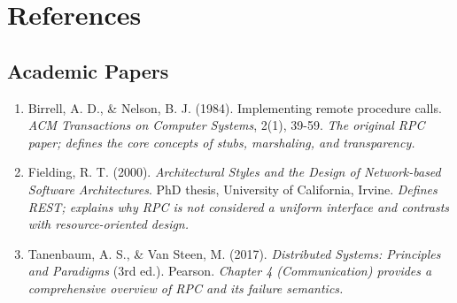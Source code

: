 \documentclass[10pt,a4paper]{article}
\begin{document}
\section*{References}
\subsection*{Academic Papers}
\begin{enumerate}
    \item Birrell, A. D., \& Nelson, B. J. (1984). Implementing remote procedure calls. \textit{ACM Transactions on Computer Systems}, 2(1), 39-59.  
    \textit{The original RPC paper; defines the core concepts of stubs, marshaling, and transparency.}
    
    \item Fielding, R. T. (2000). \textit{Architectural Styles and the Design of Network-based Software Architectures}. PhD thesis, University of California, Irvine.  
    \textit{Defines REST; explains why RPC is not considered a uniform interface and contrasts with resource-oriented design.}
    
    \item Tanenbaum, A. S., \& Van Steen, M. (2017). \textit{Distributed Systems: Principles and Paradigms} (3rd ed.). Pearson.  
    \textit{Chapter 4 (Communication) provides a comprehensive overview of RPC and its failure semantics.}
\end{enumerate}
\end{document}
